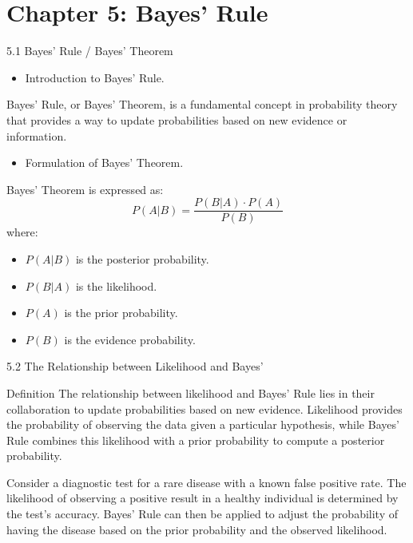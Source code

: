 \documentclass{beamer}
\begin{document}
\section{Chapter 5: Bayes' Rule}


\begin{frame}{5.1 Bayes' Rule / Bayes’ Theorem}
  \begin{itemize}
    \item Introduction to Bayes' Rule.
    \end{itemize}
    Bayes' Rule, or Bayes' Theorem, is a fundamental concept in probability theory that provides a way to update probabilities based on new evidence or information.

    \begin{itemize}
    \item Formulation of Bayes' Theorem.
  \end{itemize}
  Bayes' Theorem is expressed as:
  \[ P(A|B) = \frac{P(B|A) \cdot P(A)}{P(B)} \]
  where:
  \begin{itemize}
    \item $P(A|B)$ is the posterior probability.
    \item $P(B|A)$ is the likelihood.
    \item $P(A)$ is the prior probability.
    \item $P(B)$ is the evidence probability.
  \end{itemize}
\end{frame}


\begin{frame}{5.2 The Relationship between Likelihood and Bayes’}
  \begin{block}{Definition}
    The relationship between likelihood and Bayes' Rule lies in their collaboration to update probabilities based on new evidence. Likelihood provides the probability of observing the data given a particular hypothesis, while Bayes' Rule combines this likelihood with a prior probability to compute a posterior probability.
  \end{block}

  \begin{example}
    Consider a diagnostic test for a rare disease with a known false positive rate. The likelihood of observing a positive result in a healthy individual is determined by the test's accuracy. Bayes' Rule can then be applied to adjust the probability of having the disease based on the prior probability and the observed likelihood.
  \end{example}
\end{frame}
\end{document}
